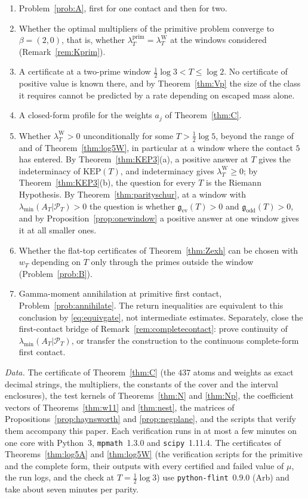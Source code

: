 \documentclass[11pt]{amsart}
\theoremstyle{definition}
\theoremstyle{remark}
\newcommand{\PT}{\mathcal P_T}
\newcommand{\lamP}{\lambda^{\mathrm{prim}}_T}
\newcommand{\lamW}{\lambda^{\mathrm W}_T}
\newcommand{\lamA}{\lambda_{\min}(A_T|\PT)}
\begin{document}
\begin{enumerate}
\item Problem~\ref{prob:A}, first for one contact and then for two.
\item Whether the optimal multipliers of the primitive problem converge to $\beta=(2,0)$, that is,
whether $\lamP=\lamW$ at the windows considered (Remark~\ref{rem:Kprim}).
\item A certificate at a two-prime window $\frac12\log3<T\le\log2$. No certificate of positive value
is known there, and by Theorem~\ref{thm:Vp} the size of the class it requires cannot be predicted by
a rate depending on escaped mass alone.
\item A closed-form profile for the weights $a_j$ of Theorem~\ref{thm:C}.
\item Whether $\lamW>0$ unconditionally for some $T>\frac12\log5$, beyond the range of \cite{Zhu2026}
and of Theorem~\ref{thm:log5W}, in particular at a window where the contact $5$ has entered. By
Theorem~\ref{thm:KEP3}(a), a positive answer at $T$ gives the indeterminacy of $\mathrm{KEP}(T)$, and
indeterminacy gives $\lamW\ge0$; by Theorem~\ref{thm:KEP3}(b), the question for every $T$ is the
Riemann Hypothesis. By Theorem~\ref{thm:parityschur}, at a window with $\lamA>0$ the question is
whether $\mathfrak g_{\mathrm{ev}}(T)>0$ and $\mathfrak g_{\mathrm{odd}}(T)>0$, and by
Proposition~\ref{prop:onewindow} a positive answer at one window gives it at all smaller ones.
\item Whether the flat-top certificates of Theorem~\ref{thm:Zexh} can be chosen with $w_T$ depending
on $T$ only through the primes outside the window (Problem~\ref{prob:B}).
\item Gamma-moment annihilation at primitive first contact, Problem~\ref{prob:annihilate}.  The
return inequalities are equivalent to this conclusion by \eqref{eq:equivgate}, not intermediate
estimates.  Separately, close the first-contact bridge of Remark~\ref{rem:completecontact}: prove
continuity of $\lamA$, or transfer the construction to the continuous complete-form first contact.
\end{enumerate}

\emph{Data.} The certificate of Theorem~\ref{thm:C} (the $437$ atoms and weights as exact decimal
strings, the multipliers, the constants of the cover and the interval enclosures), the test kernels
of Theorems~\ref{thm:N} and \ref{thm:Np}, the coefficient vectors of Theorems~\ref{thm:w11} and
\ref{thm:nest}, the matrices of Propositions~\ref{prop:haynsworth} and \ref{prop:negplane}, and the
scripts that verify them accompany this paper. Each verification runs in at most a few minutes on one
core with Python~3, \texttt{mpmath}~1.3.0 and \texttt{scipy}~1.11.4. The certificates of
Theorems~\ref{thm:log5A} and \ref{thm:log5W} (the verification scripts for the primitive and the complete
form, their outputs with every certified and failed value of $\mu$, the run logs, and the check at
$T=\frac12\log3$) use \texttt{python-flint}~0.9.0 (Arb) and take about seven minutes per parity.
\end{document}
